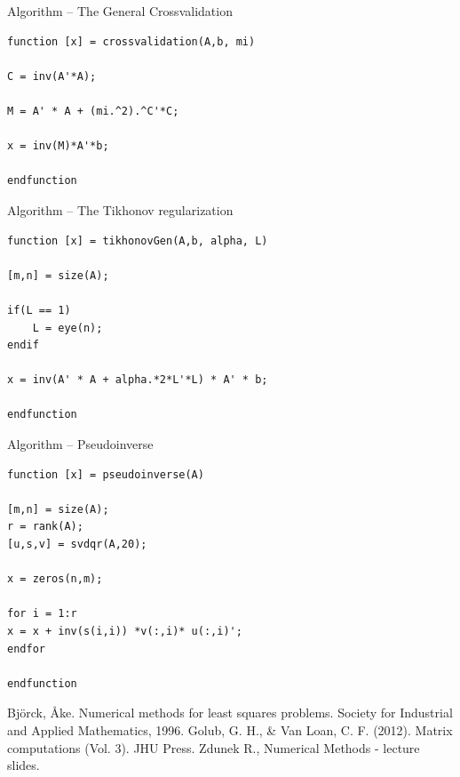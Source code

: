 \documentclass[eng,openany]{mgr}
\begin{document}
Algorithm  -- The General Crossvalidation\\
\begin{lstlisting}
function [x] = crossvalidation(A,b, mi)

C = inv(A'*A);

M = A' * A + (mi.^2).^C'*C;

x = inv(M)*A'*b;

endfunction
\end{lstlisting}
Algorithm  -- The Tikhonov regularization\\
\begin{lstlisting}
function [x] = tikhonovGen(A,b, alpha, L)

[m,n] = size(A);

if(L == 1)
	L = eye(n);
endif

x = inv(A' * A + alpha.*2*L'*L) * A' * b;

endfunction
\end{lstlisting}

Algorithm  -- Pseudoinverse\\
\begin{lstlisting}
function [x] = pseudoinverse(A)

[m,n] = size(A);
r = rank(A);
[u,s,v] = svdqr(A,20);

x = zeros(n,m);

for i = 1:r
x = x + inv(s(i,i)) *v(:,i)* u(:,i)';
endfor

endfunction
\end{lstlisting}
\begin{thebibliography}{8}
Björck, Åke. Numerical methods for least squares problems. Society for Industrial and Applied Mathematics, 1996.
Golub, G. H., \& Van Loan, C. F. (2012). Matrix computations (Vol. 3). JHU Press.
Zdunek R., Numerical Methods - lecture slides.
\end{thebibliography}
\end{document}
